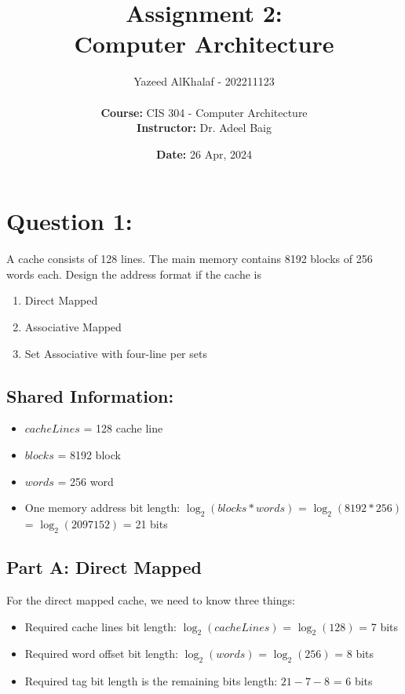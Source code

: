 \documentclass[a4paper]{article}
\title{\textbf{Assignment 2:\\Computer Architecture}}
\author{
    Yazeed AlKhalaf - 202211123\\
    \\
    \textbf{Course:} CIS 304 - Computer Architecture\\
    \textbf{Instructor:} Dr. Adeel Baig
}
\date{\textbf{Date:} 26 Apr, 2024}
\begin{document}
\maketitle

\newpage

\tableofcontents

\newpage

\section{Question 1:}

A cache consists of 128 lines. The main memory contains 8192 blocks of 256
words each. Design the address format if the cache is

\begin{enumerate}[label=(\alph*)]
    \item Direct Mapped
    \item Associative Mapped
    \item Set Associative with four-line per sets
\end{enumerate}

\subsection{Shared Information:}

\begin{itemize}
    \item $cacheLines$ = 128 cache line
    \item $blocks$ = 8192 block
    \item $words$ = 256 word
    \item One memory address bit length: $\log_2(blocks * words)$ = $\log_2(8192*256)$ = $\log_2(2097152)$ = 21 bits
\end{itemize}

\subsection{Part A: Direct Mapped}

For the direct mapped cache, we need to know three things:

\begin{itemize}
    \item Required cache lines bit length: $\log_2(cacheLines)$ = $\log_2(128)$ = 7 bits
    \item Required word offset bit length: $\log_2(words)$ = $\log_2(256)$ = 8 bits
    \item Required tag bit length is the remaining bits length: $21 - 7 - 8$ = 6 bits
\end{itemize}
\end{document}
